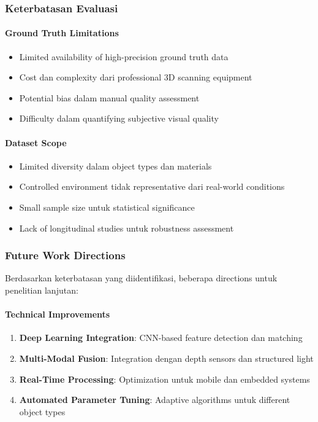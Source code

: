 \documentclass[12pt,a4paper]{article}
\begin{document}
\subsubsection{Keterbatasan Evaluasi}

\paragraph{Ground Truth Limitations}
\begin{itemize}
    \item Limited availability of high-precision ground truth data
    \item Cost dan complexity dari professional 3D scanning equipment
    \item Potential bias dalam manual quality assessment
    \item Difficulty dalam quantifying subjective visual quality
\end{itemize}

\paragraph{Dataset Scope}
\begin{itemize}
    \item Limited diversity dalam object types dan materials
    \item Controlled environment tidak representative dari real-world conditions
    \item Small sample size untuk statistical significance
    \item Lack of longitudinal studies untuk robustness assessment
\end{itemize}

\subsubsection{Future Work Directions}

Berdasarkan keterbatasan yang diidentifikasi, beberapa directions untuk penelitian lanjutan:

\paragraph{Technical Improvements}
\begin{enumerate}
    \item \textbf{Deep Learning Integration}: CNN-based feature detection dan matching
    \item \textbf{Multi-Modal Fusion}: Integration dengan depth sensors dan structured light
    \item \textbf{Real-Time Processing}: Optimization untuk mobile dan embedded systems
    \item \textbf{Automated Parameter Tuning}: Adaptive algorithms untuk different object types
\end{enumerate}
\end{document}
